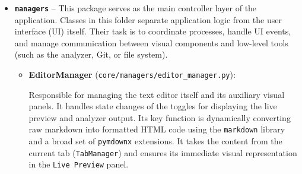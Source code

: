 \documentclass[12pt, a4paper]{article}
\begin{document}
\begin{itemize}
\begin{itemize}
        \item \textbf{FormattingValidator} (\texttt{core/analyzer/formatting\_validator.py}):

        Focuses on low-level text formatting checks. It monitors odd numbers of asterisks 
        (unclosed bold \texttt{**} or italic \texttt{*}, bullet markers are filtered out from the line), 
        images without alt text (\texttt{![](url)}), correct table composition, and the presence of the Unicode 
        \emph{replacement} character (\texttt{\textbackslash ufffd}), which indicates corrupted file encoding.

        \item \textbf{LinkValidator} (\texttt{core/analyzer/links\_validator.py}):

        Validates markdown links project-wide using a global file index (\texttt{project\_index}). 
        It verifies that every relative link to an \texttt{.md} file exists within the project, that 
        cross-references between patterns in the \emph{Related Patterns} section are reciprocal 
        (if pattern A links to pattern B, B must link back to A), and that the link label matches the 
        target file's name or one of its aliases listed in the \emph{Also Known As} section. For index 
        templates, the alias check can be skipped using the \texttt{skip\_alias\_check} flag.
    \end{itemize}

    \item \textbf{\texttt{managers}} -- This package serves as the main controller layer of the application. 
    Classes in this folder separate application logic from the user interface (UI) itself. Their task 
    is to coordinate processes, handle UI events, and manage communication between visual components and 
    low-level tools (such as the analyzer, Git, or file system).

    \begin{itemize}
        \item \textbf{EditorManager} (\texttt{core/managers/editor\_manager.py}):
        
        Responsible for managing the text editor itself and its auxiliary visual panels. It 
        handles state changes of the toggles for displaying the live preview and analyzer output. 
        Its key function is dynamically converting raw markdown into formatted HTML code using the 
        \texttt{markdown} library and a broad set of \texttt{pymdownx} extensions. 
        It takes the content from the current tab (\texttt{TabManager}) and ensures its immediate 
        visual representation in the \texttt{Live Preview} panel.


\end{itemize}
\end{itemize}
\end{document}
